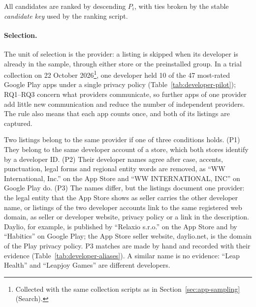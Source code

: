 \documentclass[twoside,its]{bossthesis}
\begin{document}
All candidates are ranked by descending $P_i$, with ties broken by the stable
\emph{candidate key} used by the ranking script.

\paragraph{Selection.} The unit of selection is the provider: a listing is skipped when its developer
is already in the sample, through either store or the preinstalled group. In a
trial collection on 22 October 2026\footnote{Collected with the same collection scripts as in Section~\ref{sec:app-sampling} (Search).}, one developer held 10 of the 47 most-rated
Google Play apps under a single privacy policy (Table~\ref{tab:developer-pilot});
RQ1--RQ3 concern what providers
communicate, so further apps of one provider add little new communication and
reduce the number of independent providers. The rule also means that each app
counts once, and both of its listings are captured.

Two listings belong to the same provider if one of three conditions holds.
(P1) They belong to the same developer account of a store, which both stores
identify by a developer ID\@. (P2) Their developer names agree after case,
accents, punctuation, legal forms and regional entity words are removed, as
\enquote{WW International, Inc.} on the App Store and \enquote{WW
INTERNATIONAL, INC} on Google Play do.
(P3) The names differ, but the listings document one provider: the legal entity
that the App Store shows as seller carries the other developer name, or
listings of the two developer accounts link to the same registered web domain,
as seller or developer website, privacy policy or a link in the description.
Daylio, for example, is published by
\enquote{Relaxio s.r.o.} on the App Store and by \enquote{Habitics} on Google
Play; the App Store seller website, daylio.net, is the domain of the Play
privacy policy. P3 matches are made by hand and recorded with their evidence
(Table~\ref{tab:developer-aliases}). A similar name is no evidence:
\enquote{Leap Health} and \enquote{Leapjoy Games} are different developers.
\end{document}
